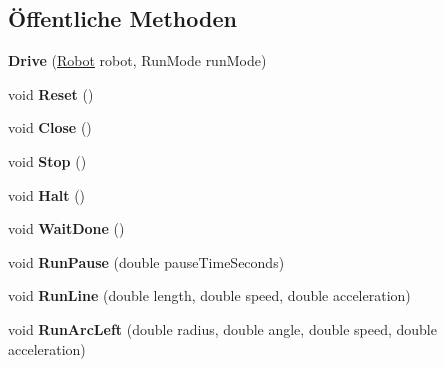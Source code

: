 \subsection*{Öffentliche Methoden}
\begin{DoxyCompactItemize}
\item 
\hypertarget{class_robot_ctrl_1_1_drive_a76fb877ffa6c136983d59ab7e8f2995b}{
{\bfseries Drive} (\hyperlink{class_robot_ctrl_1_1_robot}{Robot} robot, RunMode runMode)}
\label{class_robot_ctrl_1_1_drive_a76fb877ffa6c136983d59ab7e8f2995b}

\item 
\hypertarget{class_robot_ctrl_1_1_drive_ad79a30093b989b2b701e07d1caf7fecc}{
void {\bfseries Reset} ()}
\label{class_robot_ctrl_1_1_drive_ad79a30093b989b2b701e07d1caf7fecc}

\item 
\hypertarget{class_robot_ctrl_1_1_drive_af902934c2a3f12ef34bc55bb1827cc13}{
void {\bfseries Close} ()}
\label{class_robot_ctrl_1_1_drive_af902934c2a3f12ef34bc55bb1827cc13}

\item 
\hypertarget{class_robot_ctrl_1_1_drive_a39fa32f34e3cd62b99b502948c416897}{
void {\bfseries Stop} ()}
\label{class_robot_ctrl_1_1_drive_a39fa32f34e3cd62b99b502948c416897}

\item 
\hypertarget{class_robot_ctrl_1_1_drive_aaa24d6438ff31a1dea837423c4047096}{
void {\bfseries Halt} ()}
\label{class_robot_ctrl_1_1_drive_aaa24d6438ff31a1dea837423c4047096}

\item 
\hypertarget{class_robot_ctrl_1_1_drive_a16bd2f585366688a74f4ad550ffc2ec6}{
void {\bfseries WaitDone} ()}
\label{class_robot_ctrl_1_1_drive_a16bd2f585366688a74f4ad550ffc2ec6}

\item 
\hypertarget{class_robot_ctrl_1_1_drive_aecd1cd44e2e89488866b58c7753bb4d5}{
void {\bfseries RunPause} (double pauseTimeSeconds)}
\label{class_robot_ctrl_1_1_drive_aecd1cd44e2e89488866b58c7753bb4d5}

\item 
\hypertarget{class_robot_ctrl_1_1_drive_abdce48d8d5914d1d767f7ad11a13edbd}{
void {\bfseries RunLine} (double length, double speed, double acceleration)}
\label{class_robot_ctrl_1_1_drive_abdce48d8d5914d1d767f7ad11a13edbd}

\item 
\hypertarget{class_robot_ctrl_1_1_drive_a3ad5b9292f29e8917af31fdb964ce6b6}{
void {\bfseries RunArcLeft} (double radius, double angle, double speed, double acceleration)}
\label{class_robot_ctrl_1_1_drive_a3ad5b9292f29e8917af31fdb964ce6b6}


\end{DoxyCompactItemize}
